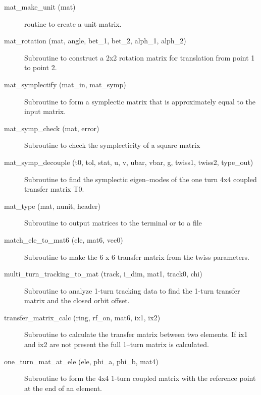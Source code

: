 \begin{description}
\item[mat\_make\_unit (mat)] \Newline 
     routine to create a unit matrix.

\item[mat\_rotation (mat, angle, bet\_1, bet\_2, alph\_1, alph\_2)] \Newline 
     Subroutine to construct a 2x2 rotation matrix for translation from
     point 1 to point 2.

\item[mat\_symplectify (mat\_in, mat\_symp)] \Newline
Subroutine to form a symplectic matrix that is approximately equal to the input matrix. 

\item[mat\_symp\_check (mat, error)] \Newline
Subroutine to check the symplecticity of a square matrix 

\item[mat\_symp\_decouple (t0, tol, stat, u, v, ubar, vbar, g, twiss1, twiss2, type\_out)] \Newline
Subroutine to find the symplectic eigen--modes of the one turn 4x4 coupled 
transfer matrix T0. 

\item[mat\_type (mat, nunit, header)] \Newline 
     Subroutine to output matrices to the terminal or to a file

\item[match\_ele\_to\_mat6 (ele, mat6, vec0)] \Newline 
Subroutine to make the 6 x 6 transfer matrix from the twiss parameters.

\item[multi\_turn\_tracking\_to\_mat (track, i\_dim, mat1, track0, chi)] \Newline
Subroutine to analyze 1-turn tracking data to find the 1-turn transfer matrix 
and the closed orbit offset.

\item[transfer\_matrix\_calc (ring, rf\_on, mat6, ix1, ix2)] \Newline
Subroutine to calculate the transfer matrix between two elements. If
ix1 and ix2 are not present the full 1--turn matrix is calculated.

\item[one\_turn\_mat\_at\_ele (ele, phi\_a, phi\_b, mat4)] \Newline
Subroutine to form the 4x4 1-turn coupled matrix with the reference point 
at the end of an element. 


\end{description}
